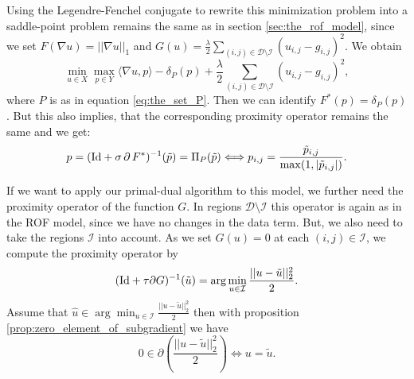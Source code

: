 \documentclass{scrreprt}
\begin{document}
        Using the Legendre-Fenchel conjugate to rewrite this minimization problem into a saddle-point problem remains the same as in section \ref{sec:the_rof_model}, since we set $F(\nabla u) = ||\nabla u||_{1}$ and $G(u) = \frac{\lambda}{2} \sum_{(i,j) \in \mathcal{D} \setminus \mathcal{I}} (u_{i,j} - g_{i,j})^{2}$. We obtain
            \begin{equation}
                \min_{u \in X} \max_{p \in Y} \langle \nabla u, p \rangle  - \delta_{P}(p) + \frac{\lambda}{2} \sum_{(i,j) \in \mathcal{D} \setminus \mathcal{I}} (u_{i,j} - g_{i,j})^{2},
                \label{eq:inpainting_primal_dual}
            \end{equation}
        where $P$ is as in equation \ref{eq:the_set_P}. Then we can identify $F^{\ast}(p) = \delta_{P}(p)$. But this also implies, that the corresponding proximity operator remains the same and we get:
            \begin{equation}
                p = (\textnormal{Id} + \sigma\,\partial\,F^{\ast})^{-1}(\tilde{p}) = \Pi_{P}(\tilde{p}) \Longleftrightarrow p_{i,j} = \frac{\tilde{p}_{i, j}}{\max(1, |\tilde{p}_{i, j}|)}.
            \label{eq:proximity_operator_f_star_inpainting}
            \end{equation}

        If we want to apply our primal-dual algorithm to this model, we further need the proximity operator of the function $G$. In regions $\mathcal{D} \setminus \mathcal{I}$ this operator is again as in the ROF model, since we have no changes in the data term. But, we also need to take the regions $\mathcal{I}$ into account. As we set $G(u) = 0$ at each $(i,j) \in \mathcal{I}$, we compute the proximity operator by
            $$
                (\textnormal{Id} + \tau \partial G)^{-1}(\tilde{u}) = \arg \min_{u \in \mathcal{I}} \frac{||u - \tilde{u}||_{2}^{2}}{2}.
            $$
        Assume that $\hat{u} \in \arg \min_{u \in \mathcal{I}} \frac{||u - \tilde{u}||_{2}^{2}}{2}$ then with proposition \ref{prop:zero_element_of_subgradient} we have
            $$
                0 \in \partial \left( \frac{||u - \tilde{u}||_{2}^{2}}{2} \right) \Longleftrightarrow u = \tilde{u}.
            $$
\end{document}
